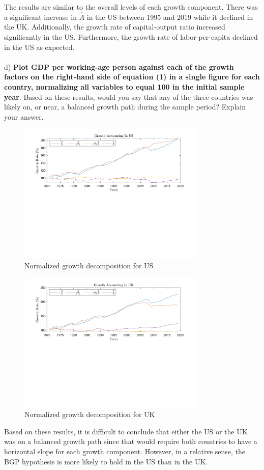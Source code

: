 \documentclass[12pt]{article}
\theoremstyle{mytheoremstyle}
\theoremstyle{mytheoremstyle}
\theoremstyle{myproblemstyle}
\begin{document}
The results are similar to the overall levels of each growth component. There was a significant increase in $\widehat{A}$ in the US between 1995 and 2019 while it declined in the UK. Additionally, the growth rate of capital-output ratio increased significantly in the US. Furthermore, the growth rate of labor-per-capita declined in the US as expected.
\\ \\ 
d) \textbf{Plot GDP per working-age person against each of the growth factors on the right-hand side of equation (1) in a single figure for each country, normalizing all variables to equal 100 in the initial sample year}. Based on these results, would you say that any of the three countries was likely on, or near, a balanced growth path during the sample period? Explain your answer.

\begin{figure}[htbp]
    \includegraphics[trim = 0in 3.2in 0in 0in, clip, width=0.8\textwidth]{out/Growth_Accounting_us_normalized.pdf}
    \caption{Normalized growth decomposition for US}
    \centering
\end{figure}

\begin{figure}[htbp]
    \includegraphics[trim = 0in 3.2in 0in 0in, clip, width=0.8\textwidth]{out/Growth_Accounting_uk_normalized.pdf}
    \caption{Normalized growth decomposition for UK}
    \centering
\end{figure}

Based on these results, it is difficult to conclude that either the US or the UK was on a balanced growth path since that would require both countries to have a horizontal slope for each growth component. However, in a relative sense, the BGP hypothesis is more likely to hold in the US than in the UK.
\end{document}
